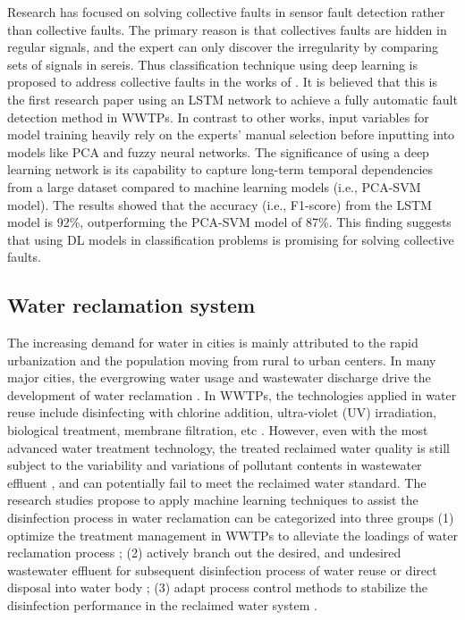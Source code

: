 Research has focused on solving collective faults in sensor fault detection rather than collective faults. The primary reason is that collectives faults are hidden in regular signals, and the expert can only discover the irregularity by comparing sets of signals in sereis. Thus classification technique using deep learning is proposed to address collective faults in the works of \citet{mamandipoorMonitoringDetectingFaults2020}. It is believed that this is the first research paper using an LSTM network to achieve a fully automatic fault detection method in WWTPs. In contrast to other works, input variables for model training heavily rely on the experts' manual selection before inputting into models like PCA and fuzzy neural networks. The significance of using a deep learning network is its capability to capture long-term temporal dependencies from a large dataset compared to machine learning models (i.e., PCA-SVM model). The results showed that the accuracy (i.e., F1-score) from the LSTM model is 92\%, outperforming the PCA-SVM model of 87\%. This finding suggests that using DL models in classification problems is promising for solving collective faults.

\subsection{Water reclamation system}
The increasing demand for water in cities is mainly attributed to the rapid urbanization and the population moving from rural to urban centers. In many major cities, the evergrowing water usage and wastewater discharge drive the development of water reclamation \citep{lyuWastewaterReclamationReuse2016}. In WWTPs, the technologies applied in water reuse include disinfecting with chlorine addition, ultra-violet (UV) irradiation, biological treatment, membrane filtration, etc \citep{norton-brandaoReclamationUsedUrban2013}. However, even with the most advanced water treatment technology, the treated reclaimed water quality is still subject to the variability and variations of pollutant contents in wastewater effluent \citep{chenAssessingWastewaterReclamation2003}, and can potentially fail to meet the reclaimed water standard. The research studies propose to apply machine learning techniques to assist the disinfection process in water reclamation can be categorized into three groups (1) optimize the treatment management in WWTPs to alleviate the loadings of water reclamation process \citep{al-ghazawiUseArtificialNeural2021,vietEnhancementMembraneSystem2021}; (2) actively branch out the desired, and undesired wastewater effluent for subsequent disinfection process of water reuse or direct disposal into water body \citep{chenAssessingWastewaterReclamation2003}; (3) adapt process control methods to stabilize the disinfection performance in the reclaimed water system \citep{demirFeedbackControlChlorine2014a}. 

